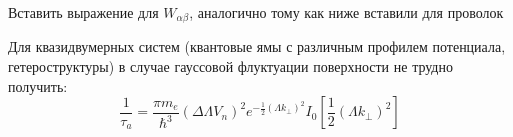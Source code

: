 {\color{red} Вставить выражение для $W_{\alpha\beta}$, аналогично тому как ниже вставили для проволок}

Для квазидвумерных систем (квантовые ямы с различным профилем потенциала, гетероструктуры) в случае гауссовой флуктуации поверхности \label{eq:1_4} не трудно получить:
\begin{equation}
\frac{1}{\tau_a}=\frac{\pi m_e}{\hbar^3}{\left(\Delta \Lambda V_n\right)}^2 e^{-\frac{1}{2}{\left(\Lambda k_\bot \right)}^2} I_0 \left[\frac{1}{2}{\left(\Lambda k_\bot \right)}^2\right]
\end{equation}


